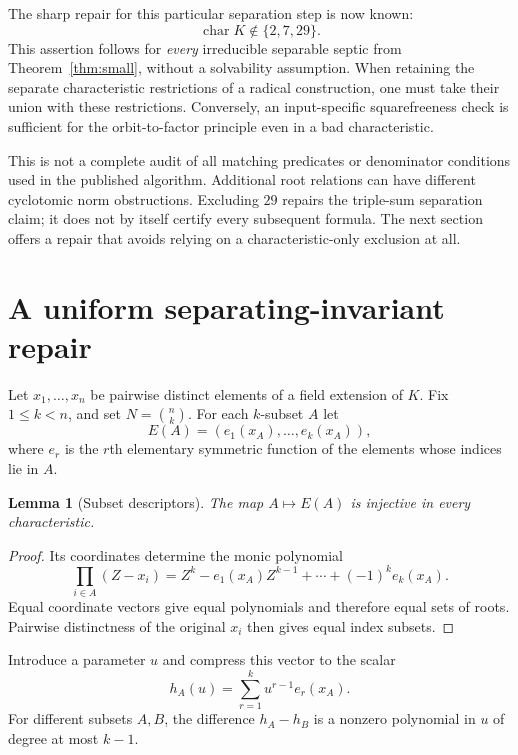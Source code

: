 \documentclass[11pt,a4paper]{article}
\newtheorem{lemma}[theorem]{Lemma}
\theoremstyle{definition}
\theoremstyle{remark}
\newcommand{\charac}{\operatorname{char}}
\begin{document}
The sharp repair for this particular separation step is now known:
\[
 \charac K\notin\{2,7,29\}.
\]
This assertion follows for \emph{every} irreducible separable septic from
Theorem~\ref{thm:small}, without a solvability assumption. When retaining
the separate characteristic restrictions of a radical construction, one
must take their union with these restrictions. Conversely, an
input-specific squarefreeness check is sufficient for the orbit-to-factor
principle even in a bad characteristic.

This is not a complete audit of all matching predicates or denominator
conditions used in the published algorithm. Additional root relations can
have different cyclotomic norm obstructions. Excluding $29$ repairs the
triple-sum separation claim; it does not by itself certify every subsequent
formula. The next section offers a repair that avoids relying on a
characteristic-only exclusion at all.

\section{A uniform separating-invariant repair}
\label{sec:repair}

Let $x_1,\ldots,x_n$ be pairwise distinct elements of a field extension of
$K$. Fix $1\leq k<n$, and set $N=\binom nk$. For each $k$-subset $A$ let
\[
 E(A)=(e_1(x_A),\ldots,e_k(x_A)),
\]
where $e_r$ is the $r$th elementary symmetric function of the elements
whose indices lie in $A$.

\begin{lemma}[Subset descriptors]\label{lem:descriptor}
The map $A\mapsto E(A)$ is injective in every characteristic.
\end{lemma}
\begin{proof}
Its coordinates determine the monic polynomial
\[
 \prod_{i\in A}(Z-x_i)
 =Z^k-e_1(x_A)Z^{k-1}+\cdots+(-1)^k e_k(x_A).
\]
Equal coordinate vectors give equal polynomials and therefore equal sets of
roots. Pairwise distinctness of the original $x_i$ then gives equal index
subsets.
\end{proof}

Introduce a parameter $u$ and compress this vector to the scalar
\begin{equation}
 h_A(u)=\sum_{r=1}^k u^{r-1}e_r(x_A).
 \label{eq:descriptor}
\end{equation}
For different subsets $A,B$, the difference $h_A-h_B$ is a nonzero
polynomial in $u$ of degree at most $k-1$.
\end{document}
